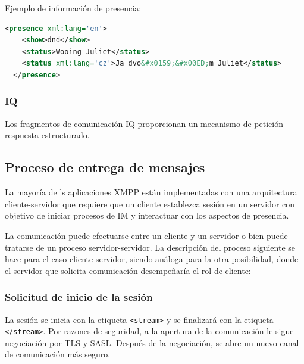 \documentclass[a4paper, 11pt]{article} %
\begin{document}
      Ejemplo de información de presencia:
  \begin{lstlisting}[language=XML]
  <presence xml:lang='en'>
    <show>dnd</show>
    <status>Wooing Juliet</status>
    <status xml:lang='cz'>Ja dvo&#x0159;&#x00ED;m Juliet</status>
  </presence>
  \end{lstlisting}
    \subsubsection{IQ}
      Los fragmentos de comunicación IQ proporcionan un mecanismo de petición-respuesta estructurado.
  
  \subsection{Proceso de entrega de mensajes}
    La mayoría de ls aplicaciones XMPP están implementadas con una arquitectura cliente-servidor que requiere que un cliente
    establezca sesión en un servidor con objetivo de iniciar procesos de IM y interactuar con los aspectos de presencia.
    
    La comunicación puede efectuarse entre un cliente y un servidor o  bien puede tratarse de un proceso servidor-servidor.
    La descripción del proceso siguiente se hace para el caso cliente-servidor, siendo análoga para la otra posibilidad, 
    donde el servidor que solicita comunicación desempeñaría el rol de cliente:
  
    \subsubsection{Solicitud de inicio de la sesión}
      La sesión se inicia con la etiqueta \texttt{<stream>} y se finalizará con la etiqueta
      \texttt{</stream>}. Por razones de seguridad, a la apertura de la comunicación le sigue
      negociación por TLS y SASL. Después de la negociación, se abre un nuevo canal de comunicación
      más seguro.
      
\end{document}
